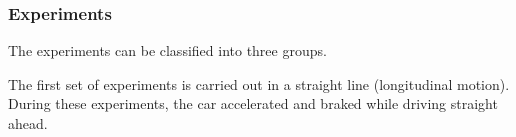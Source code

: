 
\subsubsection{Experiments}
The experiments can be classified into three groups.

The first set of experiments is carried out in a straight line (longitudinal motion). During these experiments, the car accelerated and braked while driving straight ahead. 

